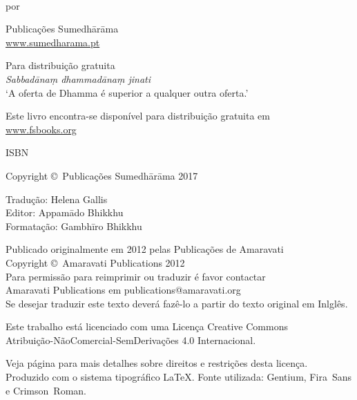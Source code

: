 \cleartoverso
\thispagestyle{empty}

\enlargethispage{3\baselineskip}

\vspace*{-3\baselineskip}

{\copyrightsize
\centering
\setlength{\parindent}{0pt}%
\setlength{\parskip}{0.8\baselineskip}%

\thetitle\\
por \theauthor

Publicações Sumedhārāma\\
\href{http://sumedharama.pt}{www.sumedharama.pt}

Para distribuição gratuita\\
\textit{Sabbadānaṃ dhammadānaṃ jinati}\\
‘A oferta de Dhamma é superior a qualquer outra oferta.’

Este livro encontra-se disponível para distribuição gratuita em\\
\href{http://fsbooks.org/}{www.fsbooks.org}

ISBN \theISBN

Copyright \copyright\ Publicações Sumedhārāma 2017

Tradução: Helena Gallis\\
Editor: Appamādo Bhikkhu\\
Formatação: Gambhīro Bhikkhu

\vfill

Publicado originalmente em 2012 pelas Publicações de Amaravati\\
Copyright \copyright\ Amaravati Publications 2012\\
Para permissão para reimprimir ou traduzir é favor contactar\\
Amaravati Publications em publications@amaravati.org\\
Se desejar traduzir este texto deverá fazê-lo a partir do texto original em Inlglês.

Este trabalho está licenciado com uma Licença Creative Commons\\
Atribuição-NãoComercial-SemDerivações 4.0 Internacional.

Veja página \pageref{copyright-details} para mais detalhes sobre direitos e restrições desta licença.\\
Produzido com o sistema tipográfico \LaTeX. Fonte utilizada: Gentium, Fira~Sans e Crimson~Roman.

\theEditionInfo

}
